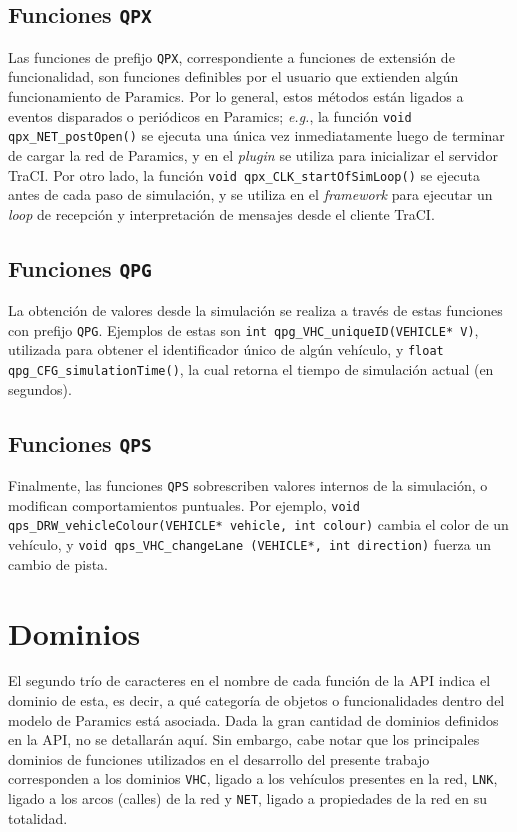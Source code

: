 \subsection{Funciones \texttt{QPX}}

Las funciones de prefijo \texttt{QPX}, correspondiente a funciones de extensión de funcionalidad, son funciones definibles por el usuario que extienden algún funcionamiento de Paramics. Por lo general, estos métodos están ligados a eventos disparados o periódicos en Paramics; \emph{e.g.}, la función \texttt{void qpx\_NET\_postOpen()} se ejecuta una única vez inmediatamente luego de terminar de cargar la red de Paramics, y en el \emph{plugin} se utiliza para inicializar el servidor TraCI. Por otro lado, la función \texttt{void qpx\_CLK\_startOfSimLoop()} se ejecuta antes de cada paso de simulación, y se utiliza en el \emph{framework} para ejecutar un \emph{loop} de recepción y interpretación de mensajes desde el cliente TraCI.

\subsection{Funciones \texttt{QPG}}

La obtención de valores desde la simulación se realiza a través de estas funciones con prefijo \texttt{QPG}. Ejemplos de estas son \texttt{int qpg\_VHC\_uniqueID(VEHICLE* V)}, utilizada para obtener el identificador único de algún vehículo, y \texttt{float qpg\_CFG\_simulationTime()}, la cual retorna el tiempo de simulación actual (en segundos).

\subsection{Funciones \texttt{QPS}}

Finalmente, las funciones \texttt{QPS} sobrescriben valores internos de la simulación, o modifican comportamientos puntuales. Por ejemplo, \texttt{void qps\_DRW\_vehicleColour(VEHICLE* vehicle, int colour)} cambia el color de un vehículo, y \texttt{void qps\_VHC\_changeLane (VEHICLE*, int direction)} fuerza un cambio de pista.

\section{Dominios}

El segundo trío de caracteres en el nombre de cada función de la API indica el dominio de esta, es decir, a qué categoría de objetos o funcionalidades dentro del modelo de Paramics está asociada. Dada la gran cantidad de dominios definidos en la API, no se detallarán aquí. Sin embargo, cabe notar que los principales dominios de funciones utilizados en el desarrollo del presente trabajo corresponden a los dominios \texttt{VHC}, ligado a los vehículos presentes en la red, \texttt{LNK}, ligado a los arcos (calles) de la red y \texttt{NET}, ligado a propiedades de la red en su totalidad.